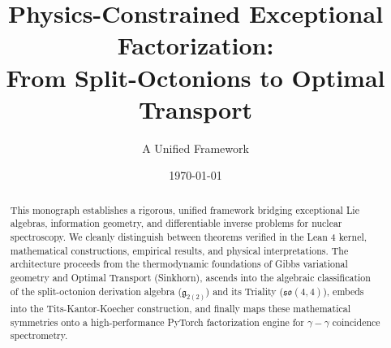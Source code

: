 \documentclass[11pt,a4paper]{article}
\title{\textbf{Physics-Constrained Exceptional Factorization:\\From Split-Octonions to Optimal Transport}}
\author{A Unified Framework}
\date{\today}
\theoremstyle{kerneltheorem}
\theoremstyle{mathconstruction}
\theoremstyle{empiricalresult}
\theoremstyle{physicalhypothesis}
\begin{document}
\maketitle

\begin{abstract}
This monograph establishes a rigorous, unified framework bridging exceptional Lie algebras, information geometry, and differentiable inverse problems for nuclear spectroscopy. We cleanly distinguish between theorems verified in the Lean 4 kernel, mathematical constructions, empirical results, and physical interpretations. The architecture proceeds from the thermodynamic foundations of Gibbs variational geometry and Optimal Transport (Sinkhorn), ascends into the algebraic classification of the split-octonion derivation algebra ($\mathfrak{g}_{2(2)}$) and its Triality ($\mathfrak{so}(4,4)$), embeds into the Tits-Kantor-Koecher construction, and finally maps these mathematical symmetries onto a high-performance PyTorch factorization engine for $\gamma-\gamma$ coincidence spectrometry.
\end{abstract}

\tableofcontents
\newpage





\end{document}
